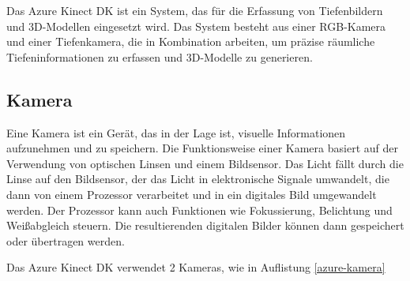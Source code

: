 Das Azure Kinect DK ist ein System, das für die Erfassung von Tiefenbildern und 3D-Modellen eingesetzt wird. Das System besteht aus einer RGB-Kamera und einer Tiefenkamera, die in Kombination arbeiten, um präzise räumliche Tiefeninformationen zu erfassen und 3D-Modelle zu generieren.

\subsection{Kamera} \label{kamera:section}
Eine Kamera ist ein Gerät, das in der Lage ist, visuelle Informationen aufzunehmen und zu speichern. Die Funktionsweise einer Kamera basiert auf der Verwendung von optischen Linsen und einem Bildsensor. Das Licht fällt durch die Linse auf den Bildsensor, der das Licht in elektronische Signale umwandelt, die dann von einem Prozessor verarbeitet und in ein digitales Bild umgewandelt werden. Der Prozessor kann auch Funktionen wie Fokussierung, Belichtung und Weißabgleich steuern. Die resultierenden digitalen Bilder können dann gespeichert oder übertragen werden. 

Das Azure Kinect \ac{DK} verwendet 2 Kameras, wie in Auflistung \ref{azure-kamera}

